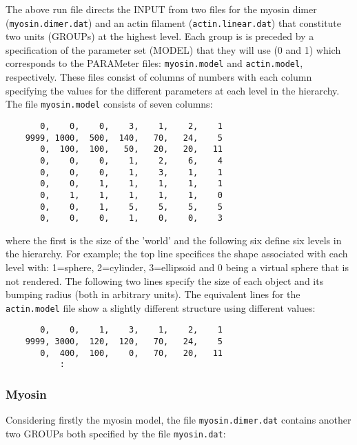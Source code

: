 The above run file directs the INPUT from two files for the myosin dimer
({\tt myosin.dimer.dat}) and an actin filament ({\tt actin.linear.dat})
that constitute two units (GROUPs) at the highest level.  Each group is 
is preceded by a specification of the parameter set (MODEL) that they
will use (0 and 1) which corresponds to the PARAMeter files:
{\tt myosin.model} and {\tt actin.model}, respectively.  These files consist
of columns of numbers with each column specifying the values for the
different parameters at each level in the hierarchy.   The file 
{\tt myosin.model} consists of seven columns:

\begin{singlespace}
\begin{verbatim}
	   0,    0,    0,    3,    1,    2,    1
	9999, 1000,  500,  140,   70,   24,    5
	   0,  100,  100,   50,   20,   20,   11
	   0,    0,    0,    1,    2,    6,    4
	   0,    0,    0,    1,    3,    1,    1
	   0,    0,    1,    1,    1,    1,    1
	   0,    1,    1,    1,    1,    1,    0
	   0,    0,    1,    5,    5,    5,    5
	   0,    0,    0,    1,    0,    0,    3
\end{verbatim}
\end{singlespace}

where the first is the size of the 'world' and the following six define
six levels in the hierarchy.  For example; the top line specifices the shape
associated with each level with: 1=sphere, 2=cylinder, 3=ellipsoid and 
0 being a virtual sphere that is not rendered.  The following two lines
specify the size of each object and its bumping radius (both in arbitrary
units).   The equivalent lines for the {\tt actin.model} file show a
slightly different structure using different values:

\begin{singlespace}
\begin{verbatim}
	   0,    0,    1,    3,    1,    2,    1
	9999, 3000,  120,  120,   70,   24,    5
	   0,  400,  100,    0,   70,   20,   11
           :
\end{verbatim}
\end{singlespace}

\subsubsection{Myosin}

Considering firstly the myosin model, the file {\tt myosin.dimer.dat} contains
another two GROUPs both specified by the file {\tt myosin.dat}:

